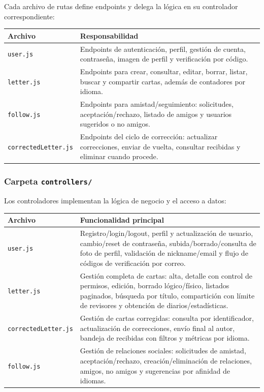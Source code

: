 Cada archivo de rutas define endpoints y delega la lógica en su controlador correspondiente:

\begin{longtable}{|p{3.8cm}|p{10.3cm}|}
\hline
\textbf{Archivo} & \textbf{Responsabilidad} \\
\hline
\texttt{user.js} & Endpoints de autenticación, perfil, gestión de cuenta, contraseña, imagen de perfil y verificación por código. \\
\hline
\texttt{letter.js} & Endpoints para crear, consultar, editar, borrar, listar, buscar y compartir cartas, además de contadores por idioma. \\
\hline
\texttt{follow.js} & Endpoints para amistad/seguimiento: solicitudes, aceptación/rechazo, listado de amigos y usuarios sugeridos o no amigos. \\
\hline
\texttt{correctedLetter.js} & Endpoints del ciclo de corrección: actualizar correcciones, enviar de vuelta, consultar recibidas y eliminar cuando procede. \\
\hline
\end{longtable}

\subsubsection{Carpeta \texttt{controllers/}}

Los controladores implementan la lógica de negocio y el acceso a datos:

\begin{longtable}{|p{3.8cm}|p{10.3cm}|}
\hline
\textbf{Archivo} & \textbf{Funcionalidad principal} \\
\hline
\texttt{user.js} & Registro/login/logout, perfil y actualización de usuario, cambio/reset de contraseña, subida/borrado/consulta de foto de perfil, validación de nickname/email y flujo de códigos de verificación por correo. \\
\hline
\texttt{letter.js} & Gestión completa de cartas: alta, detalle con control de permisos, edición, borrado lógico/físico, listados paginados, búsqueda por título, compartición con límite de revisores y obtención de diarios/estadísticas. \\
\hline
\texttt{correctedLetter.js} & Gestión de cartas corregidas: consulta por identificador, actualización de correcciones, envío final al autor, bandeja de recibidas con filtros y métricas por idioma. \\
\hline
\texttt{follow.js} & Gestión de relaciones sociales: solicitudes de amistad, aceptación/rechazo, creación/eliminación de relaciones, amigos, no amigos y sugerencias por afinidad de idiomas. \\
\hline
\end{longtable}

